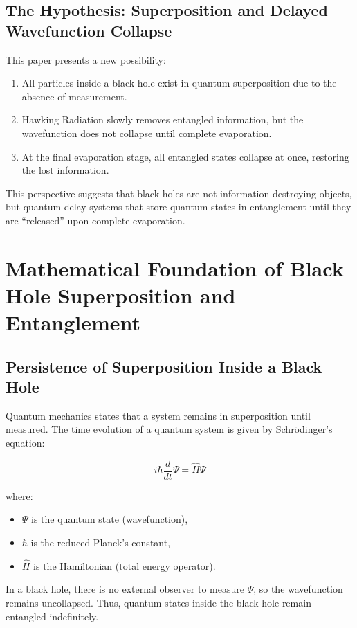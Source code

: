 \documentclass{article}
\begin{document}
\subsection{The Hypothesis: Superposition and Delayed Wavefunction Collapse}
This paper presents a new possibility:
\begin{enumerate}
    \item All particles inside a black hole exist in quantum superposition due to the absence of measurement.
    \item Hawking Radiation slowly removes entangled information, but the wavefunction does not collapse until complete evaporation.
    \item At the final evaporation stage, all entangled states collapse at once, restoring the lost information.
\end{enumerate}

This perspective suggests that black holes are not information-destroying objects, but quantum delay systems that store quantum states in entanglement until they are “released” upon complete evaporation.

\section{Mathematical Foundation of Black Hole Superposition and Entanglement}

\subsection{Persistence of Superposition Inside a Black Hole}
Quantum mechanics states that a system remains in superposition until measured. The time evolution of a quantum system is given by Schrödinger’s equation:

\begin{equation}
i\hbar \frac{d}{dt} \Psi = \hat{H} \Psi
\end{equation}

where:
\begin{itemize}
    \item \( \Psi \) is the quantum state (wavefunction),
    \item \( \hbar \) is the reduced Planck’s constant,
    \item \( \hat{H} \) is the Hamiltonian (total energy operator).
\end{itemize}

In a black hole, there is no external observer to measure \( \Psi \), so the wavefunction remains uncollapsed. Thus, quantum states inside the black hole remain entangled indefinitely.
\end{document}
